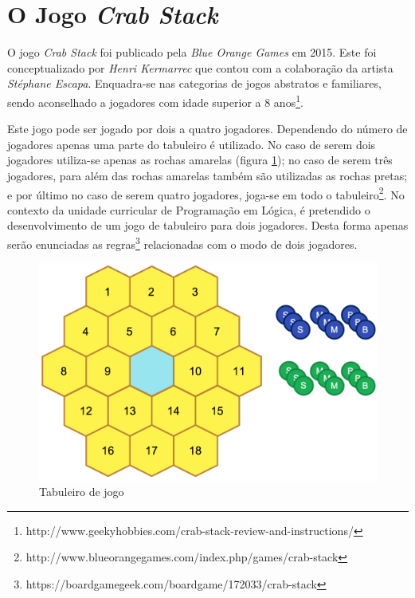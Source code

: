 \documentclass[a4paper]{article}
\begin{document}

\newpage

\section{O Jogo \textit{Crab Stack}}

O jogo \textit{Crab Stack} foi publicado pela \textit{Blue Orange Games} em 2015. Este foi conceptualizado por \textit{Henri Kermarrec} que contou com a colaboração da artista \textit{Stéphane Escapa}. Enquadra-se nas categorias de jogos abstratos e familiares, sendo aconselhado a jogadores com idade superior a 8 anos\footnote{http://www.geekyhobbies.com/crab-stack-review-and-instructions/}.

Este jogo pode ser jogado por dois a quatro jogadores. Dependendo do número de jogadores apenas uma parte do tabuleiro é utilizado. No caso de serem dois jogadores utiliza-se apenas as rochas amarelas (figura \ref{Fig:tabuleiro}); no caso de serem três jogadores, para além das rochas amarelas também são utilizadas as rochas pretas; e por último no caso de serem quatro jogadores, joga-se em todo o tabuleiro\footnote{http://www.blueorangegames.com/index.php/games/crab-stack}. No contexto da unidade curricular de Programação em Lógica, é pretendido o desenvolvimento de um jogo de tabuleiro para dois jogadores. Desta forma apenas serão enunciadas as regras\footnote{https://boardgamegeek.com/boardgame/172033/crab-stack} relacionadas com o modo de dois jogadores.

\begin{figure}[!ht]
	\begin{center}
	\includegraphics[scale=0.4]{board.png}
	\caption{Tabuleiro de jogo}
    \label{Fig:tabuleiro}
	\end{center}
\end{figure}
\end{document}
